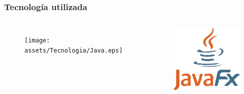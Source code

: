 \documentclass[9pt]{beamer}
\begin{document}
    \begin{frame}
        \frametitle{Tecnología utilizada}                 
        \begin{columns}
            \begin{figure}[H]
                \centering
                \texttt{[image: assets/Tecnologia/Java.eps]}
            \end{figure}

            \begin{figure}[H]
                \centering
                \includegraphics[width=\textwidth]{assets/Tecnologia/JavaFX.eps}
            \end{figure}


\end{columns}
\end{frame}
\end{document}

